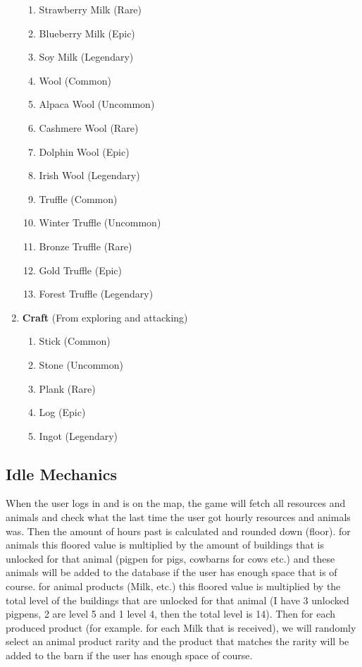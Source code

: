 \documentclass[12pt]{article}
\begin{document}
\begin{enumerate}
\begin{enumerate}
        \item Strawberry Milk (Rare)
        \item Blueberry Milk (Epic)
        \item Soy Milk (Legendary)
        \item Wool (Common)
        \item Alpaca Wool (Uncommon)
        \item Cashmere Wool (Rare)
        \item Dolphin Wool (Epic)
        \item Irish Wool (Legendary)
        \item Truffle (Common)
        \item Winter Truffle (Uncommon)
        \item Bronze Truffle (Rare)
        \item Gold Truffle (Epic)
        \item Forest Truffle (Legendary)
    \end{enumerate}
    \item \textbf{Craft} (From exploring and attacking)
    \begin{enumerate}
        \item Stick (Common)
        \item Stone (Uncommon)
        \item Plank (Rare)
        \item Log (Epic)
        \item Ingot (Legendary)
    \end{enumerate}
\end{enumerate}

\subsection{Idle Mechanics}
When the user logs in and is on the map, the game will fetch all resources and animals and check what the last time the user got hourly resources and animals was.
Then the amount of hours past is calculated and rounded down (floor).
for animals this floored value is multiplied by the amount of buildings that is unlocked for that animal (pigpen for pigs, cowbarns for cows etc.) and these animals will be added to the database if the user has enough space that is of course.
for animal products (Milk, etc.) this floored value is multiplied by the total level of the buildings that are unlocked for that animal (I have 3 unlocked pigpens, 2 are level 5 and 1 level 4, then the total level is 14).
Then for each produced product (for example. for each Milk that is received),
we will randomly select an animal product rarity and the product that matches the rarity will be added to the barn if the user has enough space of course.
\end{document}
